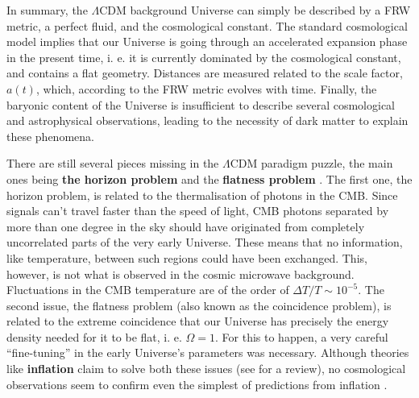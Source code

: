 \vspace{5mm}

\qquad In summary, the $\Lambda$CDM background Universe can simply be described by a FRW metric, a perfect fluid, and the cosmological constant. The standard cosmological model implies that our Universe is going through an accelerated expansion phase in the present time, i. e. it is currently dominated by the cosmological constant, and contains a flat geometry. Distances are measured related to the scale factor, $a(t)$, which, according to the FRW metric evolves with time. Finally, the baryonic content of the Universe is insufficient to describe several cosmological and astrophysical observations, leading to the necessity of dark matter to explain these phenomena. 

\qquad There are still several pieces missing in the $\Lambda$CDM paradigm puzzle, the main ones being \textbf{the horizon problem} and the \textbf{flatness problem} \citep{1994Hu-Flatness-Horizon,2005Lake-PRL-Flatness,2012Helbig-flatness}. The first one, the horizon problem, is related to the thermalisation of photons in the CMB. Since signals can't travel faster than the speed of light, CMB photons separated by more than one degree in the sky should have originated from completely uncorrelated parts of the very early Universe. These means that no information, like temperature, between such regions could have been exchanged. This, however, is not what is observed in the cosmic microwave background. Fluctuations in the CMB temperature are of the order of $\Delta T/T \sim 10^{-5}$. The second issue, the flatness problem (also known as the coincidence problem), is related to the extreme coincidence that our Universe has precisely the energy density needed for it to be flat, i. e. $\Omega = 1$. For this to happen, a very careful ``fine-tuning'' in the early Universe's parameters was necessary. Although theories like \textbf{inflation} claim to solve both these issues (see \citealt{2008InflationReview} for a review), no cosmological observations seem to confirm even the simplest of predictions from inflation \citep{2014Bicep2Planck}.

\vspace{10mm}
